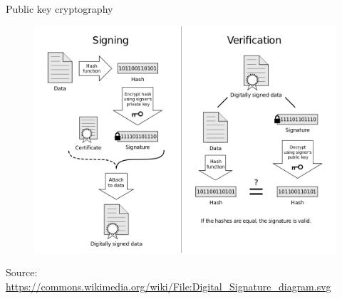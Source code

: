 \documentclass[10pt]{beamer}
\begin{document}
\begin{frame}{Public key cryptography}
	\begin{figure}[]
		\centering
		\includegraphics  [scale=0.2]{Images/Digital_Signature}
	\end{figure}
		\begin{tiny}
		Source: \href{https://commons.wikimedia.org/wiki/File:Digital\_Signature\_diagram.svg}{https://commons.wikimedia.org/wiki/File:Digital\_Signature\_diagram.svg}
	\end{tiny}
\end{frame}



\end{document}
